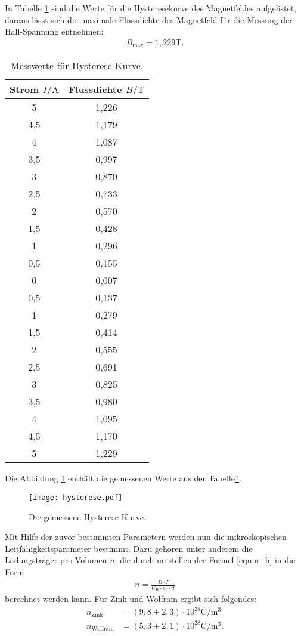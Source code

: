 In Tabelle \ref{tab:hys} sind die Werte für die Hysteresekurve des Magnetfeldes aufgelistet, daraus lässt sich die maximale Flussdichte des Magnetfeld
für die Messung der Hall-Spannung entnehmen:
\begin{align*}
 B_\mathrm{max}=1,229\si{\tesla}.
\end{align*}
\begin{table}
  \centering
  \caption{Messwerte für Hysterese Kurve.}
  \label{tab:hys}
  \begin{tabular}{c c}
    \toprule
    Strom $I/\si{\ampere}$ & Flussdichte $B/\si{\tesla}$\\
    \midrule
    5     &  1,226 \\
    4,5   &  1,179 \\
    4     &  1,087 \\
    3,5   &  0,997 \\
    3     &  0,870 \\
    2,5   &  0,733 \\
    2     &  0,570 \\
    1,5   &  0,428 \\
    1     &  0,296 \\
    0,5   &  0,155 \\
    0     &  0,007 \\
    0,5   &  0,137 \\
    1     &  0,279 \\
    1,5   &  0,414 \\
    2     &  0,555 \\
    2,5   &  0,691 \\
    3     &  0,825 \\
    3,5   &  0,980 \\
    4     &  1,095 \\
    4,5   &  1,170 \\
    5     &  1,229 \\
    \bottomrule
  \end{tabular}
\end{table}
\FloatBarrier
Die Abbildung \ref{fig:hys} enthält die gemessenen Werte aus der Tabelle\ref{tab:hys}.
\begin{figure}
  \centering
  \texttt{[image: hysterese.pdf]}
  \caption{Die gemessene Hysterese Kurve.}
  \label{fig:hys}
\end{figure}
\FloatBarrier
Mit Hilfe der zuvor bestimmten Parametern werden nun die mikroskopischen Leitfähigkeitsparameter
bestimmt.
Dazu gehören unter anderem die Ladungsträger pro Volumen $n$, die durch umstellen der Formel \eqref{eqn:u_h} in die Form
\begin{align}
  n=\frac{B \cdot I}{U_\mathrm{H}\cdot e_0 \cdot d}
\end{align}
berechnet werden kann.
Für Zink und Wolfram ergibt sich folgendes:
\begin{align*}
n_\mathrm{Zink}&=(9,8\pm2,3)\cdot10^{28}\si{\coulomb\per\meter\tothe{3}}\\
n_\mathrm{Wolfram}&=(5,3\pm2,1)\cdot10^{28}\si{\coulomb\per\meter\tothe{3}}.
\end{align*}

